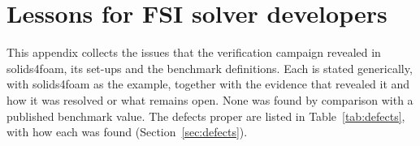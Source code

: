 \section{Lessons for FSI solver developers}
\label{app:lessons}

This appendix collects the issues that the verification campaign revealed in solids4foam, its set-ups and the benchmark definitions.
Each is stated generically, with solids4foam as the example, together with the evidence that revealed it and how it was resolved or what remains open.
None was found by comparison with a published benchmark value. The defects proper are listed in Table~\ref{tab:defects}, with how each was found (Section~\ref{sec:defects}).

